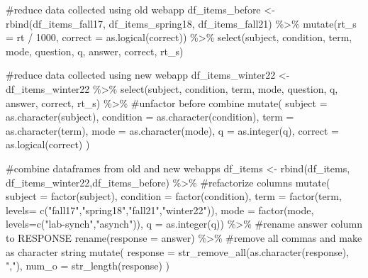 \documentclass[
  letterpaper,
  DIV=11,
  numbers=noendperiod]{scrreprt}
\newenvironment{Shaded}{\begin{snugshade}}{\end{snugshade}}
\newcommand{\AttributeTok}[1]{\textcolor[rgb]{0.40,0.45,0.13}{#1}}
\newcommand{\CommentTok}[1]{\textcolor[rgb]{0.37,0.37,0.37}{#1}}
\newcommand{\DecValTok}[1]{\textcolor[rgb]{0.68,0.00,0.00}{#1}}
\newcommand{\FunctionTok}[1]{\textcolor[rgb]{0.28,0.35,0.67}{#1}}
\newcommand{\NormalTok}[1]{\textcolor[rgb]{0.00,0.23,0.31}{#1}}
\newcommand{\OtherTok}[1]{\textcolor[rgb]{0.00,0.23,0.31}{#1}}
\newcommand{\SpecialCharTok}[1]{\textcolor[rgb]{0.37,0.37,0.37}{#1}}
\newcommand{\StringTok}[1]{\textcolor[rgb]{0.13,0.47,0.30}{#1}}
\begin{document}
\begin{Shaded}
\begin{Highlighting}[]
\CommentTok{\#reduce data collected using old webapp}
\NormalTok{df\_items\_before }\OtherTok{\textless{}{-}} \FunctionTok{rbind}\NormalTok{(df\_items\_fall17, df\_items\_spring18, df\_items\_fall21) }\SpecialCharTok{\%\textgreater{}\%} 
  \FunctionTok{mutate}\NormalTok{(}\AttributeTok{rt\_s =}\NormalTok{ rt }\SpecialCharTok{/} \DecValTok{1000}\NormalTok{, }\AttributeTok{correct =} \FunctionTok{as.logical}\NormalTok{(correct)) }\SpecialCharTok{\%\textgreater{}\%} 
  \FunctionTok{select}\NormalTok{(subject, condition, term, mode, question, q, answer, correct, rt\_s) }
  
\CommentTok{\#reduce data collected using new webapp}
\NormalTok{df\_items\_winter22 }\OtherTok{\textless{}{-}}\NormalTok{ df\_items\_winter22 }\SpecialCharTok{\%\textgreater{}\%} 
  \FunctionTok{select}\NormalTok{(subject, condition, term, mode, question, q, answer, correct, rt\_s) }\SpecialCharTok{\%\textgreater{}\%} \CommentTok{\#unfactor before combine}
  \FunctionTok{mutate}\NormalTok{(}
    \AttributeTok{subject =} \FunctionTok{as.character}\NormalTok{(subject),}
    \AttributeTok{condition =} \FunctionTok{as.character}\NormalTok{(condition),}
    \AttributeTok{term =} \FunctionTok{as.character}\NormalTok{(term),}
    \AttributeTok{mode =} \FunctionTok{as.character}\NormalTok{(mode),}
    \AttributeTok{q =} \FunctionTok{as.integer}\NormalTok{(q),}
    \AttributeTok{correct =} \FunctionTok{as.logical}\NormalTok{(correct)}
\NormalTok{  )}

\CommentTok{\#combine dataframes from old and new webapps}
\NormalTok{df\_items }\OtherTok{\textless{}{-}} \FunctionTok{rbind}\NormalTok{(df\_items, df\_items\_winter22,df\_items\_before) }\SpecialCharTok{\%\textgreater{}\%} 
  \CommentTok{\#refactorize columns}
  \FunctionTok{mutate}\NormalTok{(}
    \AttributeTok{subject =} \FunctionTok{factor}\NormalTok{(subject),}
    \AttributeTok{condition =} \FunctionTok{factor}\NormalTok{(condition),}
    \AttributeTok{term =} \FunctionTok{factor}\NormalTok{(term, }\AttributeTok{levels=} \FunctionTok{c}\NormalTok{(}\StringTok{"fall17"}\NormalTok{,}\StringTok{"spring18"}\NormalTok{,}\StringTok{"fall21"}\NormalTok{,}\StringTok{"winter22"}\NormalTok{)),}
    \AttributeTok{mode =} \FunctionTok{factor}\NormalTok{(mode, }\AttributeTok{levels=}\FunctionTok{c}\NormalTok{(}\StringTok{"lab{-}synch"}\NormalTok{,}\StringTok{"asynch"}\NormalTok{)),}
    \AttributeTok{q =} \FunctionTok{as.integer}\NormalTok{(q)) }\SpecialCharTok{\%\textgreater{}\%} 
  \CommentTok{\#rename answer column to RESPONSE }
  \FunctionTok{rename}\NormalTok{(}\AttributeTok{response =}\NormalTok{ answer) }\SpecialCharTok{\%\textgreater{}\%} 
  \CommentTok{\#remove all commas and make as character string}
  \FunctionTok{mutate}\NormalTok{(}
    \AttributeTok{response =} \FunctionTok{str\_remove\_all}\NormalTok{(}\FunctionTok{as.character}\NormalTok{(response), }\StringTok{","}\NormalTok{),}
    \AttributeTok{num\_o =} \FunctionTok{str\_length}\NormalTok{(response)}
\NormalTok{  )}



\end{Highlighting}
\end{Shaded}
\end{document}
